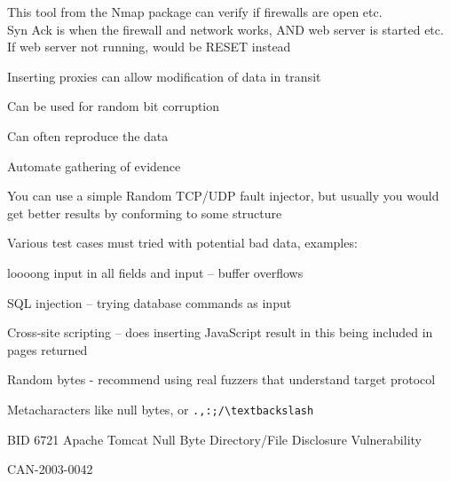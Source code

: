 \documentclass[Screen16to9,17pt]{foils}
\begin{document}
This tool from the Nmap package can verify if firewalls are open etc. \\
Syn Ack is when the firewall and network works, AND web server is started etc.\\
If web server not running, would be RESET instead






\begin{list1}
\item Inserting proxies can allow modification of data in transit
\item Can be used for random bit corruption
\item Can often reproduce the data
\item Automate gathering of evidence
\item You can use a simple Random TCP/UDP fault injector, but usually you would get better results by conforming to some structure
\item Various test cases must tried with potential bad data, examples:
\begin{list2}
\item loooong input in all fields and input -- buffer overflows
\item SQL injection -- trying database commands as input
\item Cross-site scripting -- does inserting JavaScript result in this being included in pages returned
\item Random bytes - recommend using real fuzzers that understand target protocol
\item Metacharacters like null bytes, or \verb+.,:;/\textbackslash+
\end{list2}
\end{list1}




\begin{list1}
\item BID 6721 Apache Tomcat Null Byte Directory/File Disclosure Vulnerability
\item {}
\item CAN-2003-0042
\end{list1}


\end{document}
